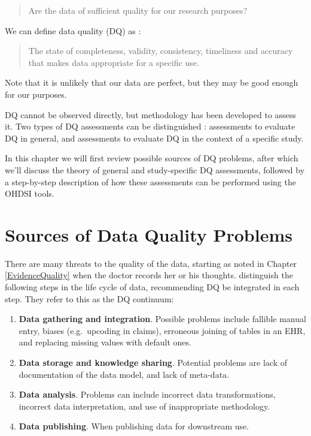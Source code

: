 \documentclass[11pt]{book}
\providecommand{\tightlist}{%
  \setlength{\itemsep}{0pt}\setlength{\parskip}{0pt}}
\theoremstyle{definition}
\theoremstyle{definition}
\theoremstyle{definition}
\theoremstyle{remark}
\begin{document}
\begin{quote}
Are the data of sufficient quality for our research purposes?
\end{quote}

We can define data quality (DQ) as \citep{roebuck_2012}:

\begin{quote}
The state of completeness, validity, consistency, timeliness and
accuracy that makes data appropriate for a specific use.
\end{quote}

Note that it is unlikely that our data are perfect, but they may be good
enough for our purposes.

DQ cannot be observed directly, but methodology has been developed to
assess it. Two types of DQ assessments can be distinguished
\citep{weiskopf_2013}: assessments to evaluate DQ in general, and
assessments to evaluate DQ in the context of a specific study.

In this chapter we will first review possible sources of DQ problems,
after which we'll discuss the theory of general and study-specific DQ
assessments, followed by a step-by-step description of how these
assessments can be performed using the OHDSI tools.

\section{Sources of Data Quality
Problems}\label{sources-of-data-quality-problems}

There are many threats to the quality of the data, starting as noted in
Chapter \ref{EvidenceQuality} when the doctor records her or his
thoughts. \citet{dasu_2003} distinguish the following steps in the life
cycle of data, recommending DQ be integrated in each step. They refer to
this as the DQ continuum:

\begin{enumerate}
\def\labelenumi{\arabic{enumi}.}
\tightlist
\item
  \textbf{Data gathering and integration}. Possible problems include
  fallible manual entry, biases (e.g.~upcoding in claims), erroneous
  joining of tables in an EHR, and replacing missing values with default
  ones.
\item
  \textbf{Data storage and knowledge sharing}. Potential problems are
  lack of documentation of the data model, and lack of meta-data.
\item
  \textbf{Data analysis}. Problems can include incorrect data
  transformations, incorrect data interpretation, and use of
  inappropriate methodology.
\item
  \textbf{Data publishing}. When publishing data for downstream use.
\end{enumerate}
\end{document}
